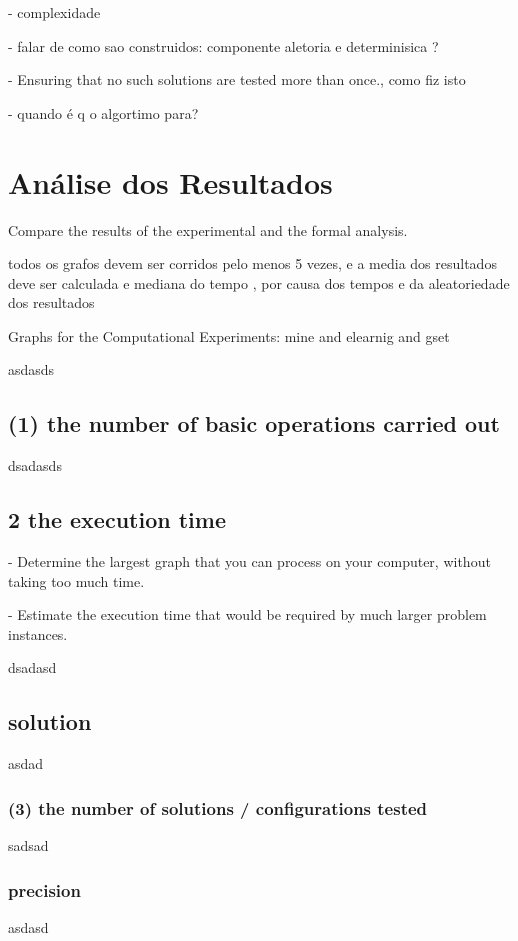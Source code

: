 \documentclass[mirror, portugues]{revdetua}
\begin{document}
- complexidade

- falar de como sao construidos: componente aletoria e determinisica ?

- Ensuring that no such solutions are tested more than once., como fiz isto

- quando é q o algortimo para?

\section{Análise dos Resultados}

Compare the results of the experimental and the formal analysis.

todos os grafos devem ser corridos pelo menos 5 vezes, e a media dos resultados deve ser calculada e mediana do tempo , por causa dos tempos e da aleatoriedade dos resultados

Graphs for the Computational Experiments: mine and elearnig and gset

asdasds

\subsection{(1) the number of basic operations carried out}

dsadasds

\subsection{2 the execution time }

- Determine the largest graph that you can process on your computer, without taking too much time.

- Estimate the execution time that would be required by much larger problem instances.

dsadasd

\subsection{solution}

asdad

\subsubsection{(3) the number of solutions / configurations tested}

sadsad

\subsubsection{precision}

asdasd




\end{document}
